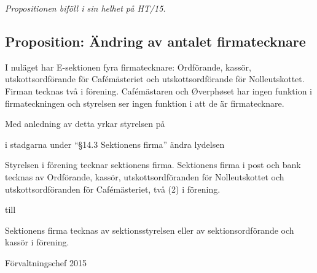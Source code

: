 \documentclass[../_main/handlingar.tex]{subfiles}
\begin{document}

\emph{Propositionen biföll i sin helhet på HT/15.}

\subsection*{Proposition: Ändring av antalet firmatecknare}
I nuläget har E-sektionen fyra firmatecknare: Ordförande, kassör, utskottsordförande för Cafémästeriet och utskottsordförande för Nolleutskottet. Firman tecknas två i förening. Cafémästaren och Øverphøset har ingen funktion i firmateckningen och styrelsen ser ingen funktion i att de är firmatecknare.

Med anledning av detta yrkar styrelsen på
\begin{attsatser}
    \att i stadgarna under ``\S14.3 Sektionens firma'' ändra lydelsen\par
    \begin{itshape}
      Styrelsen i förening tecknar sektionens firma. Sektionens firma i post och bank tecknas av Ordförande, kassör, utskottsordföranden för Nolleutskottet och utskottsordföranden för Cafémästeriet, två (2) i förening.
    \end{itshape}\par
    till\par
    \begin{itshape}
      Sektionens firma tecknas av sektionsstyrelsen eller av sektionsordförande och kassör i förening.
    \end{itshape}
\end{attsatser}

\begin{signatures}{1}
    \ist
    \signature{Henrik Felding}{Förvaltningschef 2015}
\end{signatures}
\end{document}
